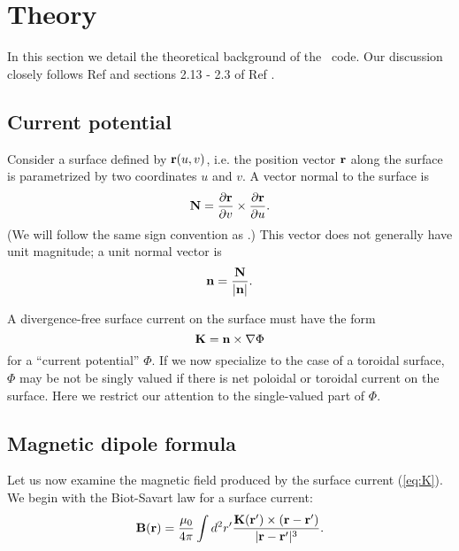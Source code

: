 \chapter{Theory}

In this section we detail the theoretical background of the \bdistrib~code.
Our discussion closely follows Ref \cite{nescoil}
and sections 2.13 - 2.3 of Ref \cite{boozer2015}.

\section{Current potential}

Consider a surface defined by ${\mathbf r}(u,v)$, i.e. the position vector ${\mathbf r}$ along the surface
is parametrized by
two coordinates $u$ and $v$.  A vector normal to the surface is
\begin{equation}
{\mathbf N} = \frac{\partial {\mathbf r}}{\partial v} \times \frac{\partial{\mathbf r}}{\partial u}.
\end{equation}
(We will follow the same sign convention as \cite{nescoil}.)
This vector does not generally have unit magnitude; a unit normal vector is
\begin{equation}
{\mathbf n} = \frac{{\mathbf N}}{|{\mathbf n}|}.
\end{equation}

A divergence-free surface current on the surface must have the form
\begin{equation}
{\mathbf K} = {\mathbf n}\times\nabla \Phi
\label{eq:K}
\end{equation}
for a ``current potential'' $\Phi$. If we now specialize to the case of a toroidal surface,
$\Phi$ may be not be singly valued if there is net poloidal or toroidal current on the surface.
Here we restrict our attention to the single-valued part of $\Phi$.

\section{Magnetic dipole formula}

Let us now examine the magnetic field produced by the surface current (\ref{eq:K}).
We begin with the Biot-Savart law for a surface current:
\begin{equation}
{\mathbf B}({\mathbf r}) = \frac{\mu_0}{4\pi} \int d^2r' \frac{{\mathbf K}({\mathbf r}')\times({\mathbf r}-{\mathbf r}')}
{|{\mathbf r}-{\mathbf r}'|^3}.
\label{eq:biot}
\end{equation}

